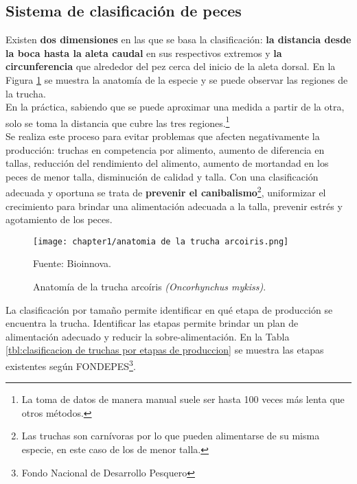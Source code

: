 \subsection{Sistema de clasificación de peces}
Existen \textbf{dos dimensiones} en las que se basa la clasificación: \textbf{la distancia desde la boca hasta la aleta caudal} en sus respectivos extremos y \textbf{la circunferencia} que alrededor del pez cerca del inicio de la aleta dorsal. En la Figura \ref{fig:anatomia de la trucha arcoiris} se muestra la anatomía de la especie y se puede observar las regiones de la trucha.\\
En la práctica, sabiendo que se puede aproximar una medida a partir de la otra, solo se toma la distancia que cubre las tres regiones.\footnote{La toma de datos de manera manual suele ser hasta 100 veces más lenta que otros métodos.}\\
Se realiza este proceso para evitar problemas que afecten negativamente la producción: truchas en competencia por alimento, aumento de diferencia en tallas, reducción del rendimiento del alimento, aumento de mortandad en los peces de menor talla, disminución de calidad y talla. Con una clasificación adecuada y oportuna se trata de \textbf{prevenir el canibalismo}\footnote{Las truchas son carnívoras por lo que pueden alimentarse de su misma especie, en este caso de los de menor talla.}, uniformizar el crecimiento para brindar una alimentación adecuada a la talla, prevenir estrés y agotamiento de los peces.\cite[p.~16]{Flores2010} \\

\begin{figure}[H]
	\centering
	\texttt{[image: chapter1/anatomia de la trucha arcoiris.png]}
	\caption{Anatomía de la trucha arcoíris \textit{(Oncorhynchus mykiss)}.}
	Fuente: Bioinnova.
	\label{fig:anatomia de la trucha arcoiris}
\end{figure}


La clasificación por tamaño permite identificar en qué etapa de producción se encuentra la trucha. Identificar las etapas permite brindar un plan de alimentación adecuado y reducir la sobre-alimentación. En la Tabla \ref{tbl:clasificacion de truchas por etapas de produccion} se muestra las etapas existentes según FONDEPES\footnote{Fondo Nacional de Desarrollo Pesquero}.

